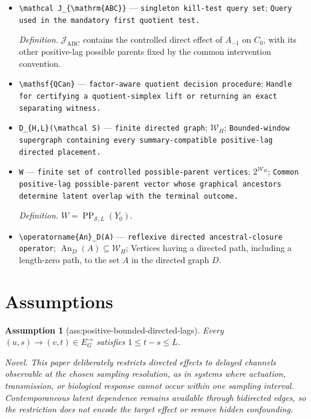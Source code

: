 \documentclass{article}
\newtheorem{assumption}{Assumption}
\begin{document}
\begin{itemize}
  \item \texttt{\textbackslash{}\allowbreak{}mathcal J\_\allowbreak{}\{\textbackslash{}\allowbreak{}mathrm\{ABC\}\allowbreak{}\}\allowbreak{}} --- \texttt{singleton kill-\allowbreak{}test query set}; \texttt{Query used in the mandatory first quotient test.}
  \par\smallskip\noindent\emph{Definition.} \(\mathcal J_{\mathrm{ABC}}\) contains the controlled direct effect of \(A_{-1}\) on \(C_0\), with its other positive-lag possible parents fixed by the common intervention convention.
  \item \texttt{\textbackslash{}\allowbreak{}mathsf\{QCan\}\allowbreak{}} --- \texttt{factor-\allowbreak{}aware quotient decision procedure}; \texttt{Handle for certifying a quotient-\allowbreak{}simplex lift or returning an exact separating witness.}
  \item \texttt{D\_\allowbreak{}\{H,\allowbreak{}L\}\allowbreak{}(\textbackslash{}\allowbreak{}mathcal S)} --- \texttt{finite directed graph}; \(\mathcal W_H\); \texttt{Bounded-\allowbreak{}window supergraph containing every summary-\allowbreak{}compatible positive-\allowbreak{}lag directed placement.}
  \item \texttt{W} --- \texttt{finite set of controlled possible-\allowbreak{}parent vertices}; \(2^{\mathcal W_H}\); \texttt{Common positive-\allowbreak{}lag possible-\allowbreak{}parent vector whose graphical ancestors determine latent overlap with the terminal outcome.}
  \par\smallskip\noindent\emph{Definition.} \(W=\operatorname{PP}_{\mathcal S,L}(Y_0)\).
  \item \texttt{\textbackslash{}\allowbreak{}operatorname\{An\}\allowbreak{}\_\allowbreak{}D(A)} --- \texttt{reflexive directed ancestral-\allowbreak{}closure operator}; \(\operatorname{An}_D(A)\subseteq\mathcal W_H\); Vertices having a directed path, including a length-zero path, to the set \(A\) in the directed graph \(D\).
\end{itemize}

\section{Assumptions}

\begin{assumption}[ass:positive-bounded-directed-lags]\label{ass:positive-bounded-directed-lags}
Every \((u,s)\to(v,t)\in E_G^{\to}\) satisfies \(1\le t-s\le L\).
\par\smallskip\noindent\emph{Novel.} This paper deliberately restricts directed effects to delayed channels observable at the chosen sampling resolution, as in systems where actuation, transmission, or biological response cannot occur within one sampling interval. Contemporaneous latent dependence remains available through bidirected edges, so the restriction does not encode the target effect or remove hidden confounding.
\end{assumption}
\end{document}
